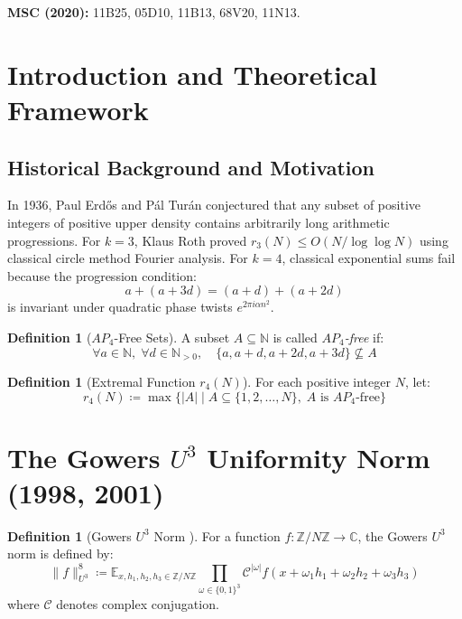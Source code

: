 \documentclass[11pt,a4paper]{article}
\theoremstyle{definition}
\newtheorem{definition}[theorem]{Definition}
\begin{document}
\noindent\textbf{MSC (2020):} 11B25, 05D10, 11B13, 68V20, 11N13.

\tableofcontents
\newpage

\section{Introduction and Theoretical Framework}

\subsection{Historical Background and Motivation}
In 1936, Paul Erd\H{o}s and P\'al Tur\'an \cite{erdos_turan1936} conjectured that any subset of positive integers of positive upper density contains arbitrarily long arithmetic progressions.
For $k = 3$, Klaus Roth \cite{roth1953} proved $r_3(N) \le O(N / \log \log N)$ using classical circle method Fourier analysis.
For $k = 4$, classical exponential sums fail because the progression condition:
\[ a + (a + 3d) = (a + d) + (a + 2d) \]
is invariant under quadratic phase twists $e^{2\pi i \alpha n^2}$.

\begin{definition}[$AP_4$-Free Sets]\label{def:ap4_free}
A subset $A \subseteq \mathbb{N}$ is called \emph{$AP_4$-free} if:
\begin{equation}\label{eq:ap4_def}
\forall a \in \mathbb{N}, \; \forall d \in \mathbb{N}_{> 0}, \quad \{a, a + d, a + 2d, a + 3d\} \not\subseteq A
\end{equation}
\end{definition}

\begin{definition}[Extremal Function $r_4(N)$]\label{def:r4_n}
For each positive integer $N$, let:
\begin{equation}\label{eq:r4_def}
r_4(N) \coloneqq \max \{ |A| \mid A \subseteq \{1, 2, \dots, N\}, \; A \text{ is } AP_4\text{-free} \}
\end{equation}
\end{definition}

\section{The Gowers $U^3$ Uniformity Norm (1998, 2001)}

\begin{definition}[Gowers $U^3$ Norm \cite{gowers1998, gowers2001}]\label{def:gowers_u3}
For a function $f : \mathbb{Z}/N\mathbb{Z} \to \mathbb{C}$, the Gowers $U^3$ norm is defined by:
\begin{equation}\label{eq:u3_def}
\| f \|_{U^3}^8 \coloneqq \mathbb{E}_{x, h_1, h_2, h_3 \in \mathbb{Z}/N\mathbb{Z}} \prod_{\omega \in \{0, 1\}^3} \mathcal{C}^{|\omega|} f(x + \omega_1 h_1 + \omega_2 h_2 + \omega_3 h_3)
\end{equation}
where $\mathcal{C}$ denotes complex conjugation.
\end{definition}
\end{document}
